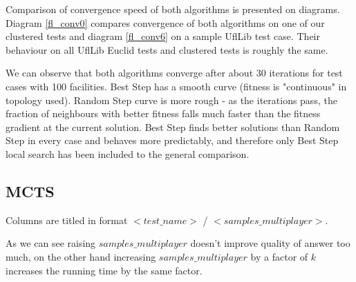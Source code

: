 Comparison of convergence speed of both algorithms is presented on diagrams.
Diagram \ref{fl_conv0} compares convergence of both algorithms on one of our clustered tests
and diagram \ref{fl_conv6} on a sample UflLib test case. Their behaviour on all UflLib Euclid
tests and clustered tests is roughly the same.

We can observe that both algorithms converge after about 30 iterations for test cases with
100 facilities. Best Step has a smooth curve (fitness is "continuous" in topology used).
Random Step curve is more rough - as the iterations pass, the fraction of neighbours with better fitness
falls much faster than the fitness gradient at the current solution.
Best Step finds better solutions than Random Step in every case and behaves more predictably,
and therefore only Best Step local search has been included to the general comparison.

\begin{figure}

\end{figure}
\begin{figure}

\end{figure}

\begin{figure}[ht]
  
\end{figure}

\subsection{MCTS}

Columns are titled in format $<test\_name>$ / $<samples\_multiplayer>$.

\begin{figure}[ht]
  
\end{figure}

\begin{figure}[ht]
  
\end{figure}

\begin{figure}[ht]
  
\end{figure}

As we can see raising $samples\_multiplayer$ doesn't improve quality of answer too much,
on the other hand increasing $samples\_multiplayer$ by a factor of $k$ increases the
running time by the same factor.
